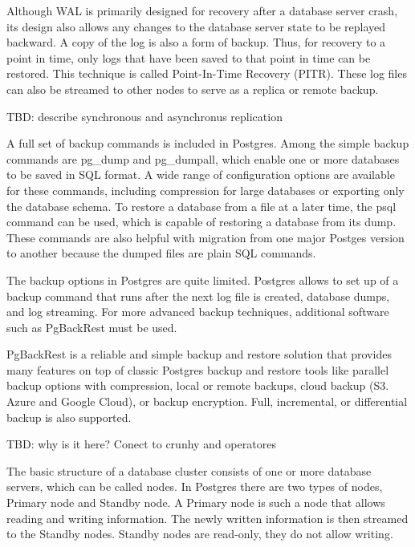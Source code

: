 Although WAL is primarily designed for recovery after a database server crash, its design also allows any changes to the database server state to be replayed backward. A copy of the log is also a form of backup. Thus, for recovery to a point in time, only logs that have been saved to that point in time can be restored. This technique is called Point-In-Time Recovery (PITR). \cite{DocuPgPITR} These log files can also be streamed to other nodes to serve as a replica or remote backup. \cite{pg14replication}

TBD: describe synchronous and asynchronus replication

A full set of backup commands is included in Postgres. Among the simple backup commands are pg\_dump and pg\_dumpall, which enable one or more databases to be saved in SQL format. A wide range of configuration options are available for these commands, including compression for large databases or exporting only the database schema. To restore a database from a file at a later time, the psql command can be used, which is capable of restoring a database from its dump. \cite{DocuPgDump} These commands are also helpful with migration from one major Postges version to another because the dumped files are plain SQL commands.

The backup options in Postgres are quite limited. Postgres allows to set up of a backup command that runs after the next log file is created, database dumps, and log streaming. For more advanced backup techniques, additional software such as PgBackRest must be used. \cite{DocuPgPITR}

PgBackRest is a reliable and simple backup and restore solution that provides many features on top of classic Postgres backup and restore tools like parallel backup options with compression, local or remote backups, cloud backup (S3. Azure and Google Cloud), or backup encryption. Full, incremental, or differential backup is also supported. \cite{PGbackRest}

TBD: why is it here? Conect to crunhy and operatores


The basic structure of a database cluster consists of one or more database servers, which can be called nodes. In Postgres there are two types of nodes, Primary node and Standby node.  A Primary node is such a node that allows reading and writing information. The newly written information is then streamed to the Standby nodes. Standby nodes are read-only, they do not allow writing. \cite{pg14replication}

